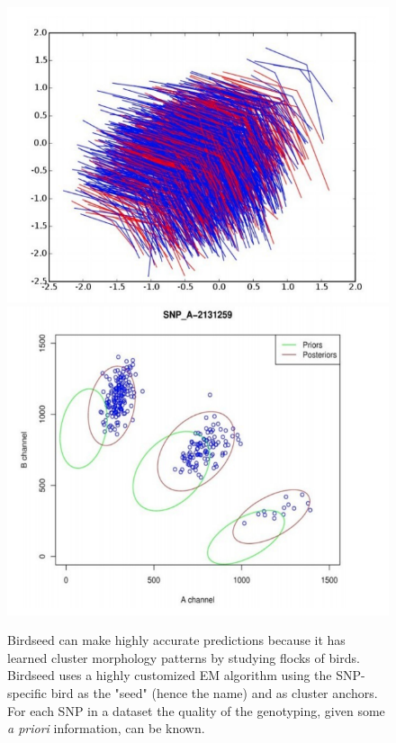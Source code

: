 			\begin{figure}[H]
				\centering
				\includegraphics[scale=0.3]{bird1}
				\includegraphics[scale=0.3]{bird2}
				\caption{Birdseed can make highly accurate predictions because it has learned cluster morphology patterns by studying flocks of birds. Birdseed uses a highly customized EM algorithm using the SNP-specific bird as the "seed" (hence the name) and as cluster anchors. For each SNP in a dataset the quality of the genotyping, given some \textit{a priori} information, can be known.}
				\label{fig:birdseed1}
			\end{figure}

